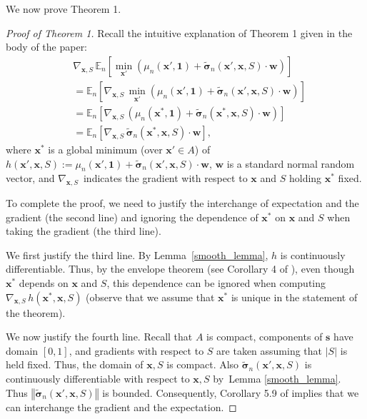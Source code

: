 \documentclass[letterpaper]{article}
\newcommand{\stcomment}[1]{{\color{red} PF: #1}}
\newcommand{\pfcomment}[1]{{\color{blue} PF: #1}}
\newcommand{\x}{\mathbf{x}}
\newcommand{\s}{\mathbf{s}}
\renewcommand{\S}{S}
\newcommand{\w}{\mathbf{w}}
\newcommand{\sigmatilde}{\tilde{\mathbf{\sigma}}}
\newcommand{\one}{\mathbf{1}}
\newcommand{\deriv}{\nabla_{\x,\S}\,}
\theoremstyle{definition}
\numberwithin{equation}{section}
\begin{document}
We now prove Theorem 1.
\begin{proof}[Proof of Theorem 1]
Recall the intuitive explanation of Theorem 1 given in the body of the paper:
\begin{align*}
&\deriv\mathbb{E}_{n}\left[\min_{\x'}\left(\mu_n\left(\x',\one\right)+\sigmatilde_{n}\left(\x', \x, \S\right)\cdot \w\right)\right]\\
&= \mathbb{E}_{n}\left[\deriv\min_{\x'}\left(\mu_n\left(\x',\one\right)+\sigmatilde_{n}\left(\x', \x, \S\right)\cdot \w\right)\right]\\
&= \mathbb{E}_{n}\left[\deriv\left(\mu_n\left(\x^*,\one\right)+\sigmatilde_{n}\left(\x^*, \x, \S\right)\cdot \w\right) \right]\\
&= \mathbb{E}_{n}\left[\deriv\sigmatilde_{n}\left(\x^*, \x, \S\right)\cdot \w\right],
\end{align*}
where $\x^*$ is a global minimum (over $\x'\in A$) of $h(\x',\x,\S) := \mu_n(\x',\one) + \sigmatilde_n(\x',\x,\S)\cdot \w$, $\w$ is a standard normal random vector, and $\deriv$ indicates the gradient with respect to $\x$ and $\S$ holding $\x^*$ fixed.

To complete the proof, we need to justify the interchange of expectation and the gradient (the second line) and ignoring the dependence of $\x^*$ on $\x$ and $\S$ 
when taking the gradient (the third line).

We first justify the third line.
By Lemma~\ref{smooth_lemma}, $h$ is continuously differentiable. 
Thus, by the envelope theorem (see Corollary 4 of \citealt{milgrom2002envelope}), even though $\x^*$ depends on $\x$ and $\S$, this dependence can be ignored when computing $\deriv h(\x^*,\x,\S)$ (observe that we assume that $\x^*$ is unique in the statement of the theorem).

We now justify the fourth line.
Recall that $A$ is compact, components of $\s$ have domain $[0,1]$, and gradients with respect to $\S$ are taken assuming that $|\S|$ is held fixed.  Thus, the domain of $\x,\S$ is compact.  Also $\sigmatilde_{n}\left(\x',\x,\S \right)$ is continuously  differentiable with respect to $\x,\S$ by~Lemma \ref{smooth_lemma}.  Thus $\left\Vert\sigmatilde_{n}\left(\x',\x,\S\right)\right\Vert$ is bounded. Consequently, Corollary 5.9 of \citet{bartle} implies that we can interchange the gradient and the expectation. 

\end{proof}
\end{document}
